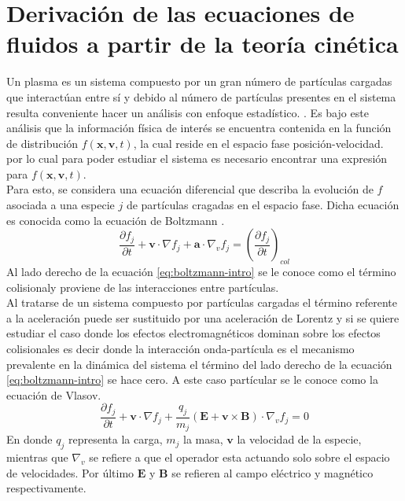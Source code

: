 \documentclass[../tesis_main_file.tex]{subfiles}
\begin{document}
\section{Derivación de las ecuaciones de fluidos a partir de la teoría cinética}
Un plasma es un sistema compuesto por un gran número de partículas cargadas que interactúan entre sí y debido al número de partículas presentes en el sistema resulta conveniente hacer un análisis con enfoque estadístico.  \cite{bittencourt2013fundamentals}.
Es bajo este análisis que la información física de interés se encuentra contenida en la función de distribución $f(\textbf{x},\textbf{v},t)$, la cual reside en el espacio fase posición-velocidad. por lo cual para poder estudiar el sistema es necesario encontrar una expresión para $f(\textbf{x},\textbf{v},t)$.\\
Para esto, se considera una ecuación diferencial que describa la evolución de $f$ asociada a una especie $j$ de partículas cragadas en el espacio fase.
 Dicha ecuación es conocida como la ecuación de Boltzmann \cite{jardin2010computational} .
\begin{equation}
\label{eq:boltzmann-intro}
\frac{\partial f_j}{\partial t}+ \textbf{v}\cdot \nabla f_j + \textbf{a}\cdot \nabla _v f_j=\left(\frac{\partial f_j}{\partial t}\right)_{col}
\end{equation}
Al lado derecho  de la ecuación \ref{eq:boltzmann-intro} se le conoce como el término colisionaly proviene de las interacciones entre partículas.\\
Al tratarse de un sistema compuesto por partículas cargadas el término referente a la aceleración puede ser sustituido por una aceleración de Lorentz y si se quiere estudiar el caso donde los efectos electromagnéticos dominan sobre los efectos colisionales es decir donde la interacción onda-partícula es el mecanismo prevalente en la dinámica del sistema el término del lado derecho de la ecuación \ref{eq:boltzmann-intro} se hace cero.
 A este caso partícular se le conoce como la ecuación de Vlasov.
\begin{equation}
\label{eq:boltzmann-vlasov-intro}
\frac{\partial f_j}{\partial t}+ \textbf{v}\cdot \nabla f_j + \frac{q_j}{m_j}\left( \textbf{E} + \textbf{v} \times \textbf{B}\right)\cdot \nabla _v f_j=0
\end{equation}
En donde $q_j$ representa la carga, $m_j$ la masa, $\textbf{v}$ la velocidad de la especie, mientras que $\nabla _v$ se refiere a que el operador esta actuando solo sobre el espacio de velocidades. Por último $\textbf{E}$ y $\textbf{B}$ se refieren al campo eléctrico y magnético respectivamente.\\
\end{document}
